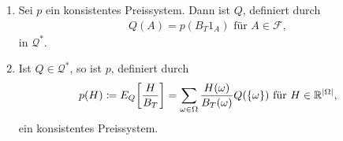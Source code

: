 \documentclass[a4paper,twoside,DIV15,BCOR12mm]{scrbook}
\newcommand{\cF}{\mathcal F}
\newcommand{\cQ}{\mathcal Q}
\begin{document}
\begin{satz}
\begin{enumerate}
\item Sei $p$ ein konsistentes Preissystem. Dann ist $Q$, definiert durch 
\begin{align*}
Q(A) = p(B_T1_A) \text{ für } A\in \cF,
\end{align*}
in $\cQ^*$.
\item Ist $Q\in \cQ^*$, so ist $p$, definiert durch
\begin{align*}
p(H) \da E_Q\bigg[\frac H {B_T}\bigg] = \sum_{\omega\in\Omega} \frac{H(\omega)}{B_T(\omega)} Q(\{\omega\}) \text{ für } H\in\MdR^{|\Omega|},
\end{align*}
ein konsistentes Preissystem.
\end{enumerate}\label{satz:2.8.3}
\end{satz}
\end{document}
